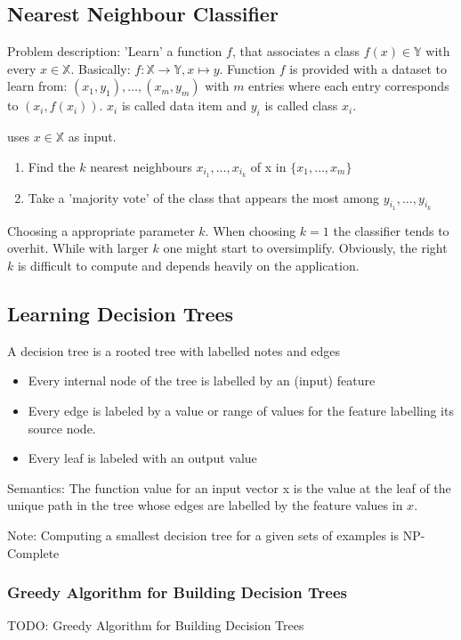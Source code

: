 \subsection{Nearest Neighbour Classifier}
Problem description: 'Learn' a function $f$, that associates a class $f(x) \in \mathbb{Y}$ with every $x \in \mathbb{X}$. Basically: $f: \mathbb{X} \rightarrow \mathbb{Y},x \mapsto y$. Function $f$ is provided with a dataset to learn from: $(x_1,y_1), \ldots, (x_m,y_m)$ with $m$ entries where each entry corresponds to $(x_i,f(x_i))$. $x_i$ is called data item and $y_i$ is called class $x_i$.

 uses $x \in \mathbb{X}$ as input.
\begin{enumerate}
	\item Find the $k$ nearest neighbours $x_{i_1},\ldots,x_{i_k}$ of x in $\{x_1,\ldots,x_m\}$
	\item Take a 'majority vote' of the class that appears the most among $y_{i_1},\ldots,y_{i_k}$
\end{enumerate}

Choosing a appropriate parameter $k$. When choosing $k=1$ the classifier tends to overhit. While with larger $k$ one might start to oversimplify. Obviously, the right $k$ is difficult to compute and depends heavily on the application.

\subsection{Learning Decision Trees}
A decision tree is a rooted tree with labelled notes and edges
\begin{itemize}
	\item Every internal node of the tree is labelled by an (input) feature
	\item Every edge is labeled by a value or range of values for the feature labelling its source node.
	\item Every leaf is labeled with an output value
\end{itemize}
Semantics: The function value for an input vector x is the value at the leaf of the unique path in the tree whose edges are labelled by the feature values in $x$.

Note: Computing a smallest decision tree for a given sets of examples is NP-Complete
\subsubsection{Greedy Algorithm for Building Decision Trees}
TODO: Greedy Algorithm for Building Decision Trees

